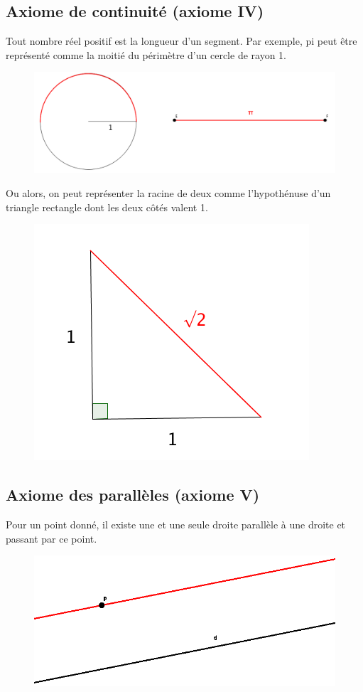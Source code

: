 \documentclass[a4paper,12pt]{article}
\begin{document}
\subsection{Axiome de continuité (axiome IV)}
Tout nombre réel positif est la longueur d'un segment. Par exemple, pi peut être représenté comme la moitié du périmètre d'un cercle de rayon 1.
\begin{figure}[H]
    \centerline{\includegraphics[scale=0.4]{pi.png}}
    \label{fig:fig2}
\end{figure}

\pagebreak
Ou alors, on peut représenter la racine de deux comme l'hypothénuse d'un triangle rectangle dont les deux côtés valent 1.
\begin{figure}[H]
    \centering
    \includegraphics[scale=0.6]{racine2.png}
\end{figure}



\subsection{Axiome des parallèles (axiome V)}
Pour un point donné, il existe une et une seule droite parallèle à une droite et passant par ce point.
\begin{figure}[H]
    \centering
    \includegraphics[scale=0.8]{parallel.eps}
\end{figure}
\end{document}
